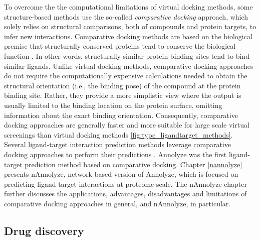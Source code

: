 \documentclass[12pt, b5paper,twoside]{tesi_upf}
\begin{document}
\par To overcome the the computational limitations of virtual docking methods, some structure-based methods use the so-called \textit{comparative docking} approach, which solely relies on structural comparisons, both of compounds and protein targets, to infer new interactions. Comparative docking methods are based on the biological premise that structurally conserved proteins tend to  conserve the biological function \cite{Marti-Renom2007, Laskowski2005, Lee2007, Holm2010}. In other words, structurally similar protein binding sites tend to bind similar ligands. Unlike virtual docking methods, comparative docking approaches do not require the computationally expensive calculations needed to obtain the structural orientation (i.e., the binding pose) of the compound  at the protein binding site. Rather, they provide a more simplistic view where the output is usually limited to the binding location on the protein surface, omitting information about the exact binding orientation. Consequently, comparative docking approaches are generally faster and more suitable for large scale virtual screenings than virtual docking methods \ref{fig:type_ligandtarget_methods}. Several ligand-target interaction prediction methods leverage comparative docking approaches to perform their predictions \cite{Hoffmann2010, Wass2010, Capra2009, Kalinina2011}. Annolyze \cite{Marti-Renom2007} was the first ligand-target prediction method based on comparative docking. Chapter \ref{nannolyze} presents nAnnolyze, network-based version of Annolyze, which is focused on predicting ligand-target interactions at proteome scale. The nAnnolyze chapter further discusses the applications, advantages, disadvantages and limitations of comparative docking approaches in general, and nAnnolyze, in particular.


\subsection{Drug discovery}\label{drug_discovery}
\end{document}
